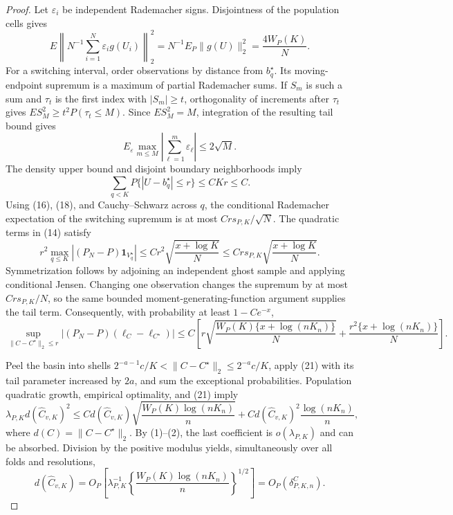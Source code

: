 \documentclass{article}
\begin{document}
\begin{proof}
Let \(\varepsilon_i\) be independent Rademacher signs.  Disjointness of the population cells gives
\[
 E\left\|N^{-1}\sum_{i=1}^N\varepsilon_i g(U_i)\right\|_2^2
 =N^{-1}E_P\|g(U)\|_2^2=\frac{4W_P(K)}N.                                   \tag{17}
\]
For a switching interval, order observations by distance from \(b_q^\star\).  Its moving-endpoint supremum is a maximum of partial Rademacher sums.  If \(S_m\) is such a sum and \(\tau_t\) is the first index with \(|S_m|\geq t\), orthogonality of increments after \(\tau_t\) gives \(ES_M^2\geq t^2P(\tau_t\leq M)\).  Since \(ES_M^2=M\), integration of the resulting tail bound gives
\[
 E_\varepsilon\max_{m\leq M}\left|\sum_{\ell=1}^m\varepsilon_\ell\right|
 \leq2\sqrt M.                                                               \tag{18}
\]
The density upper bound and disjoint boundary neighborhoods imply
\[
 \sum_{q<K}P\{|U-b_q^\star|\leq r\}\leq CKr\leq C.                        \tag{19}
\]
Using (16), (18), and Cauchy--Schwarz across \(q\), the conditional Rademacher expectation of the switching supremum is at most \(Crs_{P,K}/\sqrt N\).  The quadratic terms in (14) satisfy
\[
 r^2\max_{q\leq K}|(P_N-P)\mathbf1_{V_q^\star}|
 \leq Cr^2\sqrt{\frac{x+\log K}{N}}
 \leq Crs_{P,K}\sqrt{\frac{x+\log K}{N}}.                                 \tag{20}
\]
Symmetrization follows by adjoining an independent ghost sample and applying conditional Jensen.  Changing one observation changes the supremum by at most \(Crs_{P,K}/N\), so the same bounded moment-generating-function argument supplies the tail term.  Consequently, with probability at least \(1-Ce^{-x}\),
\[
 \sup_{\|C-C^\star\|_2\leq r}
 |(P_N-P)(\ell_C-\ell_{C^\star})|
 \leq C\left[
 r\sqrt{\frac{W_P(K)\{x+\log(nK_n)\}}N}
 +\frac{r^2\{x+\log(nK_n)\}}N\right].                                    \tag{21}
\]

Peel the basin into shells \(2^{-a-1}c/K<\|C-C^\star\|_2\leq2^{-a}c/K\), apply (21) with its tail parameter increased by \(2a\), and sum the exceptional probabilities.  Population quadratic growth, empirical optimality, and (21) imply
\[
 \lambda_{P,K}d(\widehat C_{v,K})^2
 \leq C d(\widehat C_{v,K})
 \sqrt{\frac{W_P(K)\log(nK_n)}n}
 +C d(\widehat C_{v,K})^2\frac{\log(nK_n)}n,                               \tag{22}
\]
where \(d(C)=\|C-C^\star\|_2\).  By (1)--(2), the last coefficient is \(o(\lambda_{P,K})\) and can be absorbed.  Division by the positive modulus yields, simultaneously over all folds and resolutions,
\[
 d(\widehat C_{v,K})
 =O_P\!\left[\lambda_{P,K}^{-1}
 \left\{\frac{W_P(K)\log(nK_n)}n\right\}^{1/2}\right]
 =O_P(\delta^C_{P,K,n}).                                                     \tag{23}
\]


\end{proof}
\end{document}

